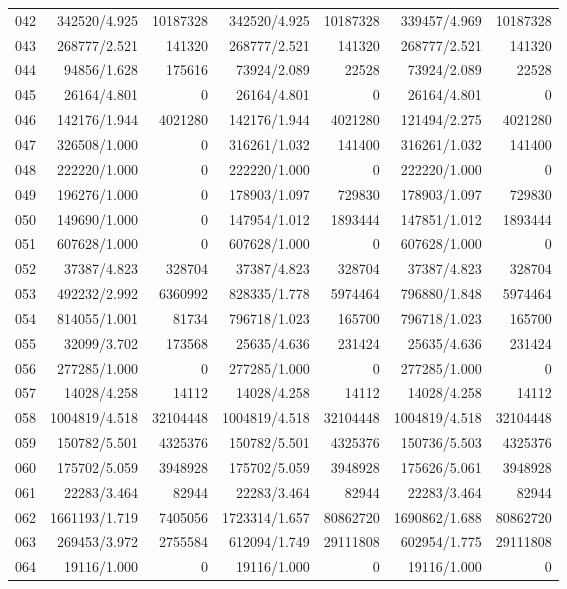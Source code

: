 \begin{longtable}{crrrrrr}
042 & 342520/4.925 & 10187328 & 342520/4.925 & 10187328 & 339457/4.969 & 10187328 \\
043 & 268777/2.521 & 141320 & 268777/2.521 & 141320 & 268777/2.521 & 141320 \\
044 & 94856/1.628 & 175616 & 73924/2.089 & 22528 & 73924/2.089 & 22528 \\
045 & 26164/4.801 & 0 & 26164/4.801 & 0 & 26164/4.801 & 0 \\
046 & 142176/1.944 & 4021280 & 142176/1.944 & 4021280 & 121494/2.275 & 4021280 \\
047 & 326508/1.000 & 0 & 316261/1.032 & 141400 & 316261/1.032 & 141400 \\
048 & 222220/1.000 & 0 & 222220/1.000 & 0 & 222220/1.000 & 0 \\
049 & 196276/1.000 & 0 & 178903/1.097 & 729830 & 178903/1.097 & 729830 \\
050 & 149690/1.000 & 0 & 147954/1.012 & 1893444 & 147851/1.012 & 1893444 \\
051 & 607628/1.000 & 0 & 607628/1.000 & 0 & 607628/1.000 & 0 \\
052 & 37387/4.823 & 328704 & 37387/4.823 & 328704 & 37387/4.823 & 328704 \\
053 & 492232/2.992 & 6360992 & 828335/1.778 & 5974464 & 796880/1.848 & 5974464 \\
054 & 814055/1.001 & 81734 & 796718/1.023 & 165700 & 796718/1.023 & 165700 \\
055 & 32099/3.702 & 173568 & 25635/4.636 & 231424 & 25635/4.636 & 231424 \\
056 & 277285/1.000 & 0 & 277285/1.000 & 0 & 277285/1.000 & 0 \\
057 & 14028/4.258 & 14112 & 14028/4.258 & 14112 & 14028/4.258 & 14112 \\
058 & 1004819/4.518 & 32104448 & 1004819/4.518 & 32104448 & 1004819/4.518 & 32104448 \\
059 & 150782/5.501 & 4325376 & 150782/5.501 & 4325376 & 150736/5.503 & 4325376 \\
060 & 175702/5.059 & 3948928 & 175702/5.059 & 3948928 & 175626/5.061 & 3948928 \\
061 & 22283/3.464 & 82944 & 22283/3.464 & 82944 & 22283/3.464 & 82944 \\
062 & 1661193/1.719 & 7405056 & 1723314/1.657 & 80862720 & 1690862/1.688 & 80862720 \\
063 & 269453/3.972 & 2755584 & 612094/1.749 & 29111808 & 602954/1.775 & 29111808 \\
064 & 19116/1.000 & 0 & 19116/1.000 & 0 & 19116/1.000 & 0 \\

\end{longtable}
